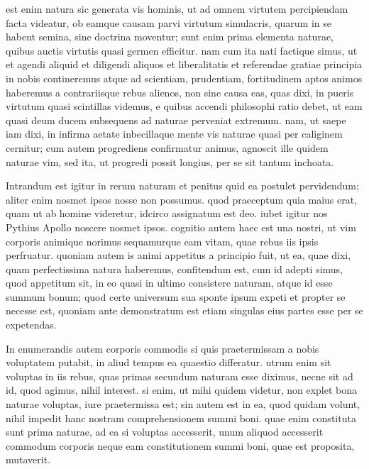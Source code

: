  est enim natura sic generata vis hominis, ut ad omnem virtutem percipiendam facta videatur, ob eamque causam parvi virtutum simulacris, quarum in se habent semina, sine doctrina moventur; sunt enim prima elementa naturae, quibus auctis virtutis quasi germen efficitur. nam cum ita nati factique simus, ut et agendi aliquid et diligendi aliquos et liberalitatis et referendae gratiae principia in nobis contineremus atque ad scientiam, prudentiam, fortitudinem aptos animos haberemus a contrariisque rebus alienos, non sine causa eas, quas dixi, in pueris virtutum quasi scintillas videmus, e quibus accendi philosophi ratio debet, ut eam quasi deum ducem subsequens ad naturae perveniat extremum. nam, ut saepe iam dixi, in infirma aetate inbecillaque mente vis naturae quasi per caliginem cernitur; cum autem progrediens confirmatur animus, agnoscit ille quidem naturae vim, sed ita, ut progredi possit longius, per se sit tantum inchoata.

 Intrandum est igitur in rerum naturam et penitus quid ea postulet pervidendum; aliter enim nosmet ipsos nosse non possumus. quod praeceptum quia maius erat, quam ut ab homine videretur, idcirco assignatum est deo. iubet igitur nos Pythius Apollo noscere nosmet ipsos. cognitio autem haec est una nostri, ut vim corporis animique norimus sequamurque eam vitam, quae rebus iis ipsis perfruatur. quoniam autem is animi appetitus a principio fuit, ut ea, quae dixi, quam perfectissima natura haberemus, confitendum est, cum id adepti simus, quod appetitum sit, in eo quasi in ultimo consistere naturam, atque id esse summum bonum; quod certe universum sua sponte ipsum expeti et propter se necesse est, quoniam ante demonstratum est etiam singulas eius partes esse per se expetendas.

 In enumerandis autem corporis commodis si quis praetermissam a nobis voluptatem putabit, in aliud tempus ea quaestio differatur. utrum enim sit voluptas in iis rebus, quas primas secundum naturam esse diximus, necne sit ad id, quod agimus, nihil interest. si enim, ut mihi quidem videtur, non explet bona naturae voluptas, iure praetermissa est; sin autem est in ea, quod quidam volunt, nihil impedit hanc nostram comprehensionem summi boni. quae enim constituta sunt prima naturae, ad ea si voluptas accesserit, unum aliquod accesserit commodum corporis neque eam constitutionem summi boni, quae est proposita, mutaverit.

